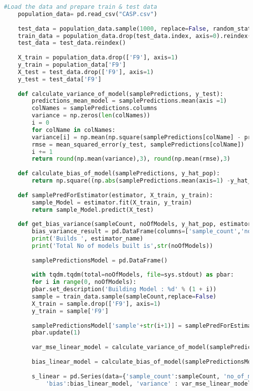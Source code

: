 \documentclass[a4paper]{article}
\begin{document}
\begin{appendices}
\begin{lstlisting}[language=Python, basicstyle=\small]
	#Load the data and prepare train & test data
	population_data= pd.read_csv("CASP.csv")
	
	test_data = population_data.sample(1000, replace=False, random_state=100)
	train_data = population_data.drop(test_data.index, axis=0).reindex()
	test_data = test_data.reindex()
	
	X_train = population_data.drop(['F9'], axis=1)
	y_train = population_data['F9']
	X_test = test_data.drop(['F9'], axis=1)
	y_test = test_data['F9']
	
	def calculate_variance_of_model(samplePredictions, y_test):
		predictions_mean_model = samplePredictions.mean(axis =1)
		colNames = samplePredictions.columns
		variance = np.zeros(len(colNames))
		i = 0
		for colName in colNames:
		variance[i] = np.mean(np.square(samplePredictions[colName] - predictions_mean_model))
		rmse = mean_squared_error(y_test, samplePredictions[colName])
		i += 1
		return round(np.mean(variance),3), round(np.mean(rmse),3)
	
	def calculate_bias_of_model(samplePredictions, y_hat_pop):
		return np.square((np.abs(samplePredictions.mean(axis=1) -y_hat_pop).mean()))
	
	def samplePredForEstimator(estimator, X_train, y_train):
		sample_Model = estimator.fit(X_train, y_train)
		return sample_Model.predict(X_test)
	
	def get_bias_variance(sampleCount, noOfModels, y_hat_pop, estimator_name, estimator):
		bias_variance_result = pd.DataFrame(columns=['sample_count','no_of_models','algorithm','bias','variance', 'mse'])
		print('Builds ', estimator_name)
		print('Total No of models built is',str(noOfModels))
		
		samplePredictionsModel = pd.DataFrame()
		
		with tqdm.tqdm(total=noOfModels, file=sys.stdout) as pbar:
		for i in range(0, noOfModels):
		pbar.set_description('Building Model : %d' % (1 + i))
		sample = train_data.sample(sampleCount,replace=False)
		X_train = sample.drop(['F9'], axis=1)
		y_train = sample['F9']
		
		samplePredictionsModel['sample'+str(i+1)] = samplePredForEstimator(estimator, X_train, y_train)
		pbar.update(1)
		
		var_mse_linear_model = calculate_variance_of_model(samplePredictionsModel, y_test)
		
		bias_linear_model = calculate_bias_of_model(samplePredictionsModel, y_hat_pop)
		
		s_linear = pd.Series(data={'sample_count':sampleCount, 'no_of_models':noOfModels, 'algorithm':'LR',
			'bias':bias_linear_model, 'variance' : var_mse_linear_model[0], 'mse' : var_mse_linear_model[1]}, name = 0)
		

\end{lstlisting}
\end{appendices}
\end{document}
